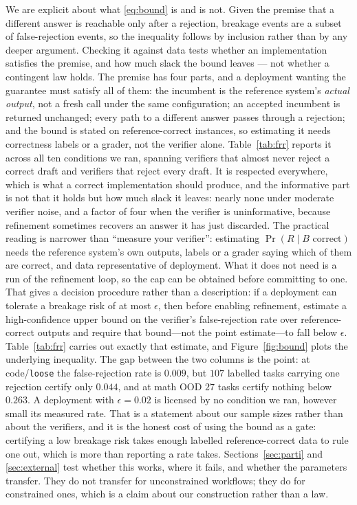 \documentclass{article}
\begin{document}
We are explicit about what \eqref{eq:bound} is and is not. Given the premise that
a different answer is reachable only after a rejection, breakage events are a
subset of false-rejection events, so the inequality follows by inclusion rather
than by any deeper argument. Checking it against data tests whether an
implementation satisfies the premise, and how much slack the bound leaves --- not
whether a contingent law holds. The premise has four parts, and a deployment
wanting the guarantee must satisfy all of them: the incumbent is the reference
system's \emph{actual output}, not a fresh call under the same configuration; an
accepted incumbent is returned unchanged; every path to a different answer
passes through a rejection; and the bound is stated on reference-correct
instances, so estimating it needs correctness labels or a grader, not the
verifier alone. Table~\ref{tab:frr} reports it across all
ten conditions we ran, spanning verifiers that almost never reject a correct
draft and verifiers that reject every draft. It is respected everywhere, which
is what a correct implementation should produce, and the informative part is not
that it holds but how much slack it leaves: nearly none under moderate verifier
noise, and a factor of four when the verifier is uninformative, because
refinement sometimes recovers an answer it has just discarded. The practical reading is narrower than
``measure your verifier'': estimating $\Pr(R \mid B\text{ correct})$ needs the
reference system's own outputs, labels or a grader saying which of them are
correct, and data representative of deployment. What it does not need is a run
of the refinement loop, so the cap can be obtained before committing to one.
That gives a decision procedure rather than a description: if a deployment can
tolerate a breakage risk of at most $\epsilon$, then before enabling refinement,
estimate a high-confidence upper bound on the verifier's false-rejection rate
over reference-correct outputs and require that bound---not the point
estimate---to fall below $\epsilon$. Table~\ref{tab:frr} carries out exactly that
estimate, and Figure~\ref{fig:bound} plots the underlying inequality. The gap
between the two columns is the point: at code/\texttt{loose} the false-rejection
rate is $0.009$, but $107$ labelled tasks carrying one rejection certify only
$0.044$, and at math OOD $27$ tasks certify nothing below $0.263$. A deployment
with $\epsilon = 0.02$ is licensed by no condition we ran, however small its
measured rate. That is a statement about our sample sizes rather than about the
verifiers, and it is the honest cost of using the bound as a gate: certifying a
low breakage risk takes enough labelled reference-correct data to rule one out,
which is more than reporting a rate takes. Sections~\ref{sec:parti} and
\ref{sec:external} test whether this works, where it fails, and whether the
parameters transfer. They do not transfer for unconstrained workflows; they do
for constrained ones, which is a claim about our construction rather than a law.
\end{document}
